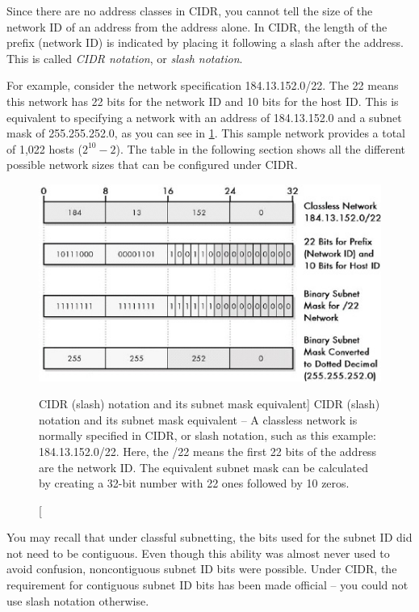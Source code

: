 \begin{keyconcept}
Since there are no address classes in CIDR, you cannot tell the size of the network ID of an address from the address alone.
In CIDR, the length of the prefix (network ID) is indicated by placing it following a slash after the address.
This is called \emph{CIDR notation}, or \emph{slash notation}.
\end{keyconcept}

For example, consider the network specification 184.13.152.0/22. The 22
means this network has 22 bits for the network ID and 10 bits for the
host ID. This is equivalent to specifying a network with an address of
184.13.152.0 and a subnet mask of 255.255.252.0, as you can see in \cref{fig:cidr-notation}.
This sample network provides a total of 1,022 hosts ($2^{10}-2$).
The table in the following section shows all the different possible network sizes that can be configured under CIDR.


\begin{figure}
   \centering
   \includegraphics[width=.7\textwidth]{images/cidr-notation.jpg}
   \caption
      [CIDR (slash) notation and its subnet mask equivalent]
      {CIDR (slash) notation and its subnet mask equivalent -- A
      classless network is normally specified in CIDR, or slash notation, such
      as this example: 184.13.152.0/22. Here, the /22 means the first 22 bits
      of the address are the network ID. The equivalent subnet mask can be
      calculated by creating a 32-bit number with 22 ones followed by 10
      zeros.}
   \label{fig:cidr-notation}
\end{figure}


\begin{note}
You may recall that under classful subnetting, the bits used for
the subnet ID did not need to be contiguous. Even though this ability
was almost never used to avoid confusion, noncontiguous subnet ID bits
were possible. Under CIDR, the requirement for contiguous subnet ID bits
has been made official -- you could not use slash notation otherwise.
\end{note}



